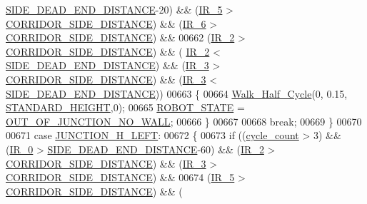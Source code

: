 \begin{DoxyCode}
      \hyperlink{state__machine_8c_a31ba7e3e0116f665d5825f669052ed09}{SIDE\_DEAD\_END\_DISTANCE}-20) && (\hyperlink{state__machine_8c_ad00ba6cc1cf461bda7059f5aafc06142}{IR\_5} > 
      \hyperlink{state__machine_8c_a201d56046ddf552d57b4862e0ec07a10}{CORRIDOR\_SIDE\_DISTANCE}) && (\hyperlink{state__machine_8c_a8c51bcd8b555e8c78fea79b88d28b55e}{IR\_6} > 
      \hyperlink{state__machine_8c_a201d56046ddf552d57b4862e0ec07a10}{CORRIDOR\_SIDE\_DISTANCE}) && 
00662                 (\hyperlink{state__machine_8c_a07cfb2e201909d017a88a2a86c32cd4b}{IR\_2} > \hyperlink{state__machine_8c_a201d56046ddf552d57b4862e0ec07a10}{CORRIDOR\_SIDE\_DISTANCE}) && (
      \hyperlink{state__machine_8c_a07cfb2e201909d017a88a2a86c32cd4b}{IR\_2} < \hyperlink{state__machine_8c_a31ba7e3e0116f665d5825f669052ed09}{SIDE\_DEAD\_END\_DISTANCE}) && (\hyperlink{state__machine_8c_a7831b71dc250258ecefe0e23f9920688}{IR\_3} > 
      \hyperlink{state__machine_8c_a201d56046ddf552d57b4862e0ec07a10}{CORRIDOR\_SIDE\_DISTANCE}) && (\hyperlink{state__machine_8c_a7831b71dc250258ecefe0e23f9920688}{IR\_3} < 
      \hyperlink{state__machine_8c_a31ba7e3e0116f665d5825f669052ed09}{SIDE\_DEAD\_END\_DISTANCE}))
00663             \{
00664                 \hyperlink{gangstilar_8c_a8b22e9229a15d20adb676428ad7f6dac}{Walk\_Half\_Cycle}(0, 0.15, \hyperlink{state__machine_8c_ac66326c4fb942a9dfa998832832bc776}{STANDARD\_HEIGHT},0);
00665                 \hyperlink{state__machine_8h_a5e5321a4a9085b83c8161454bf7a145c}{ROBOT\_STATE} = \hyperlink{state__machine_8h_a94b1da2e055fff4d143aa6aa891f79a9a72c6eea91f84cfab54daac571b35fc53}{OUT\_OF\_JUNCTION\_NO\_WALL};
00666             \}
00667             
00668             \textcolor{keywordflow}{break};
00669         \}
00670         
00671         \textcolor{keywordflow}{case} \hyperlink{state__machine_8h_a94b1da2e055fff4d143aa6aa891f79a9ae0346a57432afc9d40b29ab7bc71ef1b}{JUNCTION\_H\_LEFT}:
00672         \{
00673             \textcolor{keywordflow}{if} ((\hyperlink{state__machine_8c_a937f74a65988b9e22241ab3765b82c50}{cycle\_count} > 3) && (\hyperlink{state__machine_8c_a7afcf874a71b2cde367dc9c28f5f01f1}{IR\_0} > 
      \hyperlink{state__machine_8c_a31ba7e3e0116f665d5825f669052ed09}{SIDE\_DEAD\_END\_DISTANCE}-60) && (\hyperlink{state__machine_8c_a07cfb2e201909d017a88a2a86c32cd4b}{IR\_2} > 
      \hyperlink{state__machine_8c_a201d56046ddf552d57b4862e0ec07a10}{CORRIDOR\_SIDE\_DISTANCE}) && (\hyperlink{state__machine_8c_a7831b71dc250258ecefe0e23f9920688}{IR\_3} > 
      \hyperlink{state__machine_8c_a201d56046ddf552d57b4862e0ec07a10}{CORRIDOR\_SIDE\_DISTANCE}) && 
00674                 (\hyperlink{state__machine_8c_ad00ba6cc1cf461bda7059f5aafc06142}{IR\_5} > \hyperlink{state__machine_8c_a201d56046ddf552d57b4862e0ec07a10}{CORRIDOR\_SIDE\_DISTANCE}) && (

\end{DoxyCode}

